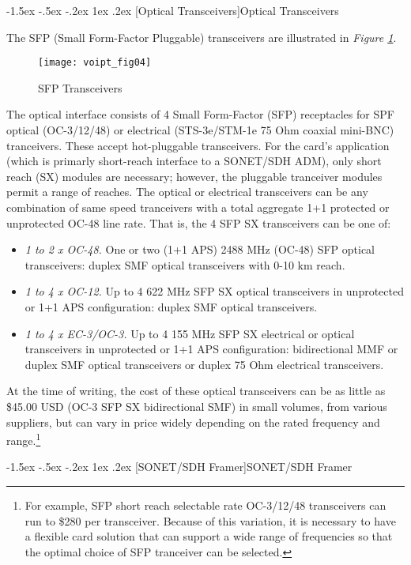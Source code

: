\documentclass[letterpaper,final,notitlepage,twocolumn,10pt,twoside]{article}
\makeatletter
\let\normalsize = \small
\let\small = \footnotesize
\let\footnotesize = \scriptsize
\let\scriptsize = \tiny
\renewcommand\subsection{\@startsection{subsection}{2}{\z@}%
                                     {-1.5ex \@plus -.5ex \@minus -.2ex}%
                                     {1ex \@plus .2ex}%
                                     {\normalfont\normalsize\bfseries}}
\makeatother
\begin{document}
\subsection[Optical Transceivers]{Optical Transceivers}

The SFP (Small Form-Factor Pluggable) transceivers are illustrated in
\textsl{Figure \ref{figure:voipt_fig04}}.
\begin{figure}[htp]
\center\texttt{[image: voipt\_fig04]}
\caption[Tranceivers]{SFP Transceivers}
\label{figure:voipt_fig04}
\end{figure}
The optical interface consists of 4 Small Form-Factor (SFP) receptacles for SPF
optical (OC-3/12/48) or electrical (STS-3e/STM-1e 75 Ohm coaxial mini-BNC)
tranceivers.  These accept hot-pluggable transceivers.  For the card's
application (which is primarly short-reach interface to a SONET/SDH ADM), only
short reach (SX) modules are necessary; however, the pluggable tranceiver
modules permit a range of reaches.  The optical or electrical transceivers can
be any combination of same speed tranceivers with a total aggregate 1+1
protected or unprotected OC-48 line rate.
That is, the 4 SFP SX transceivers can be one of:
\begin{itemize}
\item \textsl{1 to 2 x OC-48.}
	One or two (1+1 APS) 2488 MHz (OC-48) SFP optical transceivers: duplex
	SMF optical transceivers with 0-10 km reach.
\item \textsl{1 to 4 x OC-12.}
	Up to 4 622 MHz SFP SX optical transceivers in unprotected or 1+1 APS
	configuration: duplex SMF optical transceivers.
\item \textsl{1 to 4 x EC-3/OC-3.}
	Up to 4 155 MHz SFP SX electrical or optical transceivers in unprotected
	or 1+1 APS configuration: bidirectional MMF or duplex SMF optical
	transceivers or duplex 75 Ohm electrical transceivers.
\end{itemize}
At the time of writing, the cost of these optical transceivers can be as little
as \$45.00 USD (OC-3 SFP SX bidirectional SMF) in small volumes, from various
suppliers, but can vary in price widely depending on the rated frequency and
range.\footnote{For example, SFP short reach selectable rate OC-3/12/48
transceivers can run to \$280 per transceiver.  Because of this variation, it
is necessary to have a flexible card solution that can support a wide range of
frequencies so that the optimal choice of SFP tranceiver can be selected.}

\subsection[SONET/SDH Framer]{SONET/SDH Framer}
\end{document}
